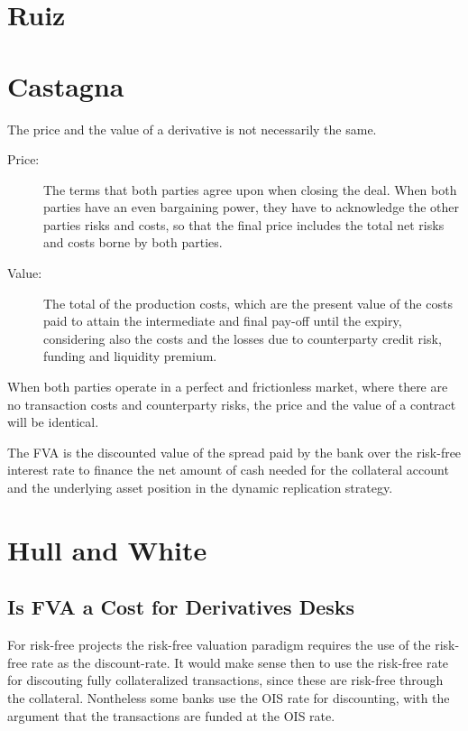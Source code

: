 \documentclass[10pt,a4paper]{article}
\begin{document}
     \section{Ruiz}

     \section{Castagna}
        The price and the value of a derivative is not necessarily the same.

        \begin{description}
            \item[Price:] The terms that both parties agree upon when closing the deal. When both parties have an even bargaining power, they have to acknowledge the other parties risks and costs, so that the final price includes the total net risks and costs borne by both parties.
            \item[Value:] The total of the production costs, which are the present value of the costs paid to attain the intermediate and final pay-off until the expiry, considering also the costs and the losses due to counterparty credit risk, funding and liquidity premium.
        \end{description}

        When both parties operate in a perfect and frictionless market, where there are no transaction costs and counterparty risks, the price and the value of a contract will be identical.

        The FVA is the discounted value of the spread paid by the bank over the risk-free interest rate to finance the net amount of cash needed for the collateral account and the underlying asset position in the dynamic replication strategy.

    \section{Hull and White}
    \subsection{Is FVA a Cost for Derivatives Desks}
        For risk-free projects the risk-free valuation paradigm requires the use of the risk-free rate as the discount-rate. It would make sense then to use the risk-free rate for discouting fully collateralized transactions, since these are risk-free through the collateral. Nontheless some banks use the OIS rate for discounting, with the argument that the transactions are funded at the OIS rate. 
\end{document}
